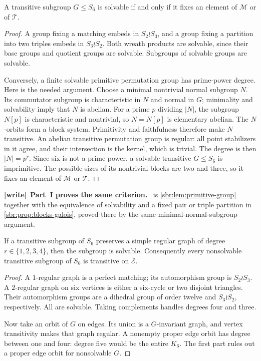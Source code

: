 \documentclass[11pt,letterpaper]{article}
\numberwithin{equation}{section}
\theoremstyle{definition}
\theoremstyle{remark}
\newcommand{\Edges}{\mathcal E}
\newcommand{\tpoM}{\mathcal M}
\newcommand{\tpoT}{\mathcal T}
\newenvironment{writenote}[1][]{\par\smallskip\begingroup\small
 \noindent\textbf{[write]}\if\relax\detokenize{#1}\relax\else~\textbf{#1.}\fi\ }%
 {\par\endgroup\smallskip}
\begin{document}
\begin{lemma}
\label{tpo:lem:block}
A transitive subgroup $G\le S_6$ is solvable if and only if it fixes an element
of $\tpoM$ or of $\tpoT$.
\end{lemma}
\begin{proof}
A group fixing a matching embeds in $S_2\wr S_3$, and a group fixing a
partition into two triples embeds in $S_3\wr S_2$. Both wreath products are
solvable, since their base groups and quotient groups are solvable. Subgroups
of solvable groups are solvable.

Conversely, a finite solvable primitive permutation group has prime-power
degree. Here is the needed argument. Choose a minimal nontrivial normal
subgroup $N$. Its commutator subgroup is characteristic in $N$ and normal in
$G$; minimality and solvability imply that $N$ is abelian. For a prime $p$
dividing $|N|$, the subgroup $N[p]$ is characteristic and nontrivial, so
$N=N[p]$ is elementary abelian. The $N$-orbits form a block system. Primitivity
and faithfulness therefore make $N$ transitive. An abelian transitive
permutation group is regular: all point stabilizers in it agree, and their
intersection is the kernel, which is trivial. The degree is then $|N|=p^r$.
Since six is not a prime power, a solvable transitive $G\le S_6$ is
imprimitive. The possible sizes of its nontrivial blocks are two and three,
so it fixes an element of $\tpoM$ or $\tpoT$.
\end{proof}

\begin{writenote}[Part~I proves the same criterion]
 is \cref{sbr:lem:primitive-group} together with the
equivalence of solvability and a fixed pair or triple partition in
\cref{sbr:prop:blocks-galois}, proved there by the same
minimal-normal-subgroup argument.
\end{writenote}

\begin{lemma}
\label{tpo:lem:graphs}
If a transitive subgroup of $S_6$ preserves a simple regular graph of degree
$r\in\{1,2,3,4\}$, then the subgroup is solvable. Consequently every
nonsolvable transitive subgroup of $S_6$ is transitive on $\Edges$.
\end{lemma}
\begin{proof}
A $1$-regular graph is a perfect matching; its automorphism group is
$S_2\wr S_3$. A $2$-regular graph on six vertices is either a six-cycle or
two disjoint triangles. Their automorphism groups are a dihedral group of
order twelve and $S_3\wr S_2$, respectively. All are solvable. Taking
complements handles degrees four and three.

Now take an orbit of $G$ on edges. Its union is a $G$-invariant graph, and
vertex transitivity makes that graph regular. A nonempty proper edge orbit
has degree between one and four: degree five would be the entire $K_6$.
The first part rules out a proper edge orbit for nonsolvable $G$.
\end{proof}
\end{document}
